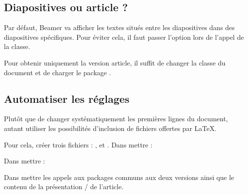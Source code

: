 \subsection{Diapositives ou article ?}

Par défaut, Beamer va afficher les textes situés entre les diapositives dans des diapositives spécifiques. Pour éviter cela, il faut passer l'option  lors de l'appel de la classe.


Pour obtenir uniquement la version article, il suffit de changer la classe du document et de charger le package .


\subsection{Automatiser les réglages}

Plutôt que de changer systématiquement les premières lignes du document, autant utiliser les possibilités d'inclusion de fichiers offertes par \LaTeX{}. 

Pour cela, créer trois fichiers :  ,  et .
Dans  mettre :


Dans  mettre :


Dans  mettre les appels aux packages communs aux deux versions ainsi que le contenu de la présentation / de l'article.



